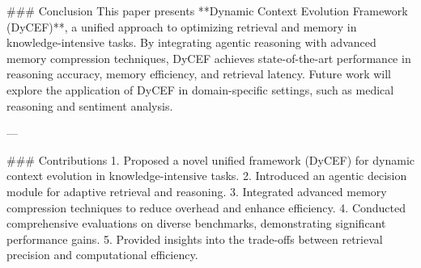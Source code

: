 ### Conclusion
This paper presents **Dynamic Context Evolution Framework (DyCEF)**, a unified approach to optimizing retrieval and memory in knowledge-intensive tasks. By integrating agentic reasoning with advanced memory compression techniques, DyCEF achieves state-of-the-art performance in reasoning accuracy, memory efficiency, and retrieval latency. Future work will explore the application of DyCEF in domain-specific settings, such as medical reasoning and sentiment analysis.

---

### Contributions
1. Proposed a novel unified framework (DyCEF) for dynamic context evolution in knowledge-intensive tasks.
2. Introduced an agentic decision module for adaptive retrieval and reasoning.
3. Integrated advanced memory compression techniques to reduce overhead and enhance efficiency.
4. Conducted comprehensive evaluations on diverse benchmarks, demonstrating significant performance gains.
5. Provided insights into the trade-offs between retrieval precision and computational efficiency.

